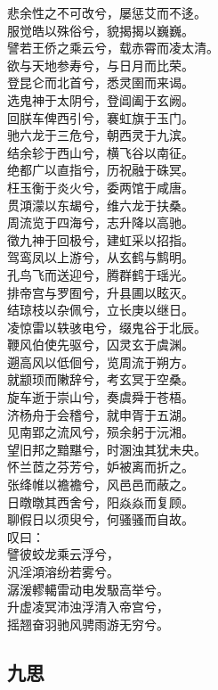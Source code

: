 \documentclass[]{article}
\begin{document}
悲余性之不可改兮，屡惩艾而不迻。\\
服觉皓以殊俗兮，貌揭揭以巍巍。\\
譬若王侨之乘云兮，载赤霄而凌太清。\\
欲与天地参寿兮，与日月而比荣。\\
登昆仑而北首兮，悉灵圉而来谒。\\
选鬼神于太阴兮，登阊阖于玄阙。\\
回朕车俾西引兮，褰虹旗于玉门。\\
驰六龙于三危兮，朝西灵于九滨。\\
结余轸于西山兮，横飞谷以南征。\\
绝都广以直指兮，历祝融于硃冥。\\
枉玉衡于炎火兮，委两馆于咸唐。\\
贯澒濛以东朅兮，维六龙于扶桑。\\
周流览于四海兮，志升降以高驰。\\
徵九神于回极兮，建虹采以招指。\\
驾鸾凤以上游兮，从玄鹤与鹪明。\\
孔鸟飞而送迎兮，腾群鹤于瑶光。\\
排帝宫与罗囿兮，升县圃以眩灭。\\
结琼枝以杂佩兮，立长庚以继日。\\
凌惊雷以轶骇电兮，缀鬼谷于北辰。\\
鞭风伯使先驱兮，囚灵玄于虞渊。\\
遡高风以低佪兮，览周流于朔方。\\
就颛顼而敶辞兮，考玄冥于空桑。\\
旋车逝于崇山兮，奏虞舜于苍梧。\\
济杨舟于会稽兮，就申胥于五湖。\\
见南郢之流风兮，殒余躬于沅湘。\\
望旧邦之黯黮兮，时溷浊其犹未央。\\
怀兰茝之芬芳兮，妒被离而折之。\\
张绛帷以襜襜兮，风邑邑而蔽之。\\
日暾暾其西舍兮，阳焱焱而复顾。\\
聊假日以须臾兮，何骚骚而自故。\\
叹曰：\\
譬彼蛟龙乘云浮兮，\\
汎淫澒溶纷若雾兮。\\
潺湲轇轕雷动电发馺高举兮。\\
升虚凌冥沛浊浮清入帝宫兮，\\
摇翘奋羽驰风骋雨游无穷兮。

\hypertarget{header-n365}{%
\subsection{九思}\label{header-n365}}
\end{document}

